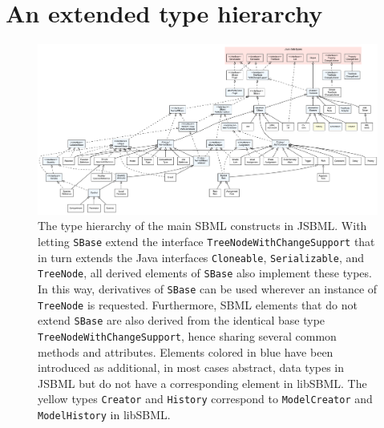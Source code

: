 \section{An extended type hierarchy}

\begin{figure}
\centering
\includegraphics[width=\textwidth]{../img/FullTypeHierarchy.pdf}
\caption[The type hierarchy of the main SBML constructs in JSBML]{The type
hierarchy of the main SBML constructs in JSBML. With letting \texttt{SBase}
extend the interface \texttt{TreeNodeWithChangeSupport} that in turn extends the
Java interfaces \texttt{Cloneable}, \texttt{Serializable}, and
\texttt{TreeNode}, all derived elements of \texttt{SBase} also implement these
types. In this way, derivatives of \texttt{SBase} can be used wherever an
instance of \texttt{TreeNode} is requested. Furthermore, SBML elements that do
not extend \texttt{SBase} are also derived from the identical base type
\texttt{TreeNodeWithChangeSupport}, hence sharing several common methods and
attributes. Elements colored in blue have been introduced as additional, in most
cases abstract, data types in JSBML but do not have a corresponding element in
libSBML. The yellow types \texttt{Creator} and \texttt{History} correspond to
\texttt{ModelCreator} and \texttt{ModelHistory} in libSBML.}
\label{fig:TypeHierarchy}
\end{figure}
